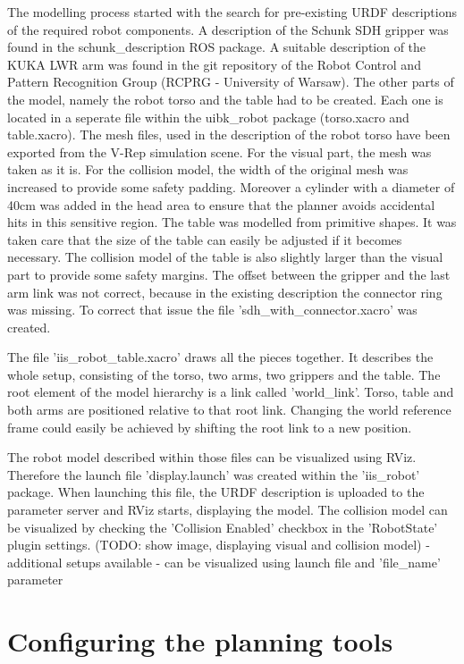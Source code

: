 The modelling process started with the search for pre-existing URDF descriptions of the required robot components. A description of the Schunk SDH gripper was found in the schunk\_description ROS package. A suitable description of the KUKA LWR arm was found in the git repository of the Robot Control and Pattern Recognition Group (RCPRG - University of Warsaw). The other parts of the model, namely the robot torso and the table had to be created. Each one is located in a seperate file within the uibk\_robot package (torso.xacro and table.xacro). The mesh files, used in the description of the robot torso have been exported from the V-Rep simulation scene. For the visual part, the mesh was taken as it is. For the collision model, the width of the original mesh was increased to provide some safety padding. Moreover a cylinder with a diameter of 40cm was added in the head area to ensure that the planner avoids accidental hits in this sensitive region.
The table was modelled from primitive shapes. It was taken care that the size of the table can easily be adjusted if it becomes necessary. The collision model of the table is also slightly larger than the visual part to provide some safety margins.
The offset between the gripper and the last arm link was not correct, because in the existing description the connector ring was missing. To correct that issue the file 'sdh\_with\_connector.xacro' was created.

The file 'iis\_robot\_table.xacro' draws all the pieces together. It describes the whole setup, consisting of the torso, two arms, two grippers and the table. The root element of the model hierarchy is a link called 'world\_link'. Torso, table and both arms are positioned relative to that root link. Changing the world reference frame could easily be achieved by shifting the root link to a new position.

The robot model described within those files can be visualized using RViz. Therefore the launch file 'display.launch' was created within the 'iis\_robot' package. When launching this file, the URDF description is uploaded to the parameter server and RViz starts, displaying the model. The collision model can be visualized by checking the 'Collision Enabled' checkbox in the 'RobotState' plugin settings. (TODO: show image, displaying visual and collision model)
- additional setups available
- can be visualized using launch file and 'file\_name' parameter


\section{Configuring the planning tools}

